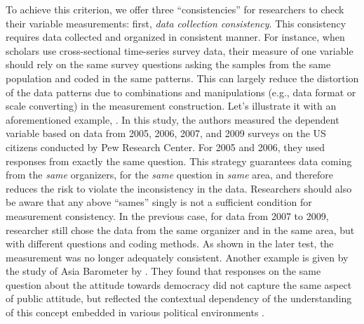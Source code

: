 To achieve this criterion, we offer three ``consistencies'' for researchers to check their variable measurements: first, \textit{data collection consistency}. This consistency requires data collected and organized in consistent manner. For instance, when scholars use cross-sectional time-series survey data, their measure of one variable should rely on the same survey questions asking the samples from the same population and coded in the same patterns. This can largely reduce the distortion of the data patterns due to combinations and manipulations (e.g., data format or scale converting) in the measurement construction. Let's illustrate it with an aforementioned example, \cite{Newman2015}. In this study, the authors measured the dependent variable based on data from 2005, 2006, 2007, and 2009 surveys on the US citizens conducted by Pew Research Center. For 2005 and 2006, they used responses from exactly the same question. This strategy guarantees data coming from the \textit{same} organizers, for the \textit{same} question in \textit{same} area, and therefore reduces the risk to violate the inconsistency in the data. Researchers should also be aware that any above ``sames'' singly is not a sufficient condition for measurement consistency. In the previous case, for data from 2007 to 2009, researcher still chose the data from the same organizer and in the same area, but with different questions and coding methods. As shown in the later test, the measurement was no longer adequately consistent. Another example is given by the study of Asia Barometer by \cite{Chu2010}. They found that responses on the same question about the attitude towards democracy did not capture the same aspect of public attitude, but reflected the contextual dependency of the understanding of this concept embedded in various political environments \cite[see, also, ][]{Lu2014a}.

